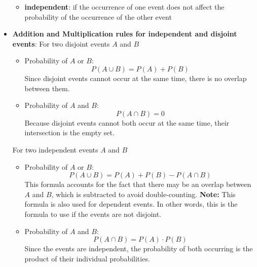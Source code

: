 \documentclass{report}
\begin{document}
\begin{itemize}
\begin{itemize}
                \item \textbf{independent}: if the occurrence of one event does not affect the probability of the occurrence of the other event
            \end{itemize}
        \item \textbf{Addition and Multiplication rules for independent and disjoint events}:
            \bigbreak \noindent 
            For two disjoint events $A$ and $B$
            \begin{itemize}
                \item Probability of \( A \) or \( B \):
                    \[
                        P(A \cup B) = P(A) + P(B)
                    \]
                    Since disjoint events cannot occur at the same time, there is no overlap between them.
                \item Probability of \( A \) and \( B \):
                    \[
                        P(A \cap B) = 0
                    \]
                    Because disjoint events cannot both occur at the same time, their intersection is the empty set.
            \end{itemize}
            \bigbreak \noindent 
            For two independent events $A$ and $B$
            \begin{itemize}
                \item Probability of \( A \) or \( B \):
                    \[
                        P(A \cup B) = P(A) + P(B) - P(A \cap B)
                    \]
                    This formula accounts for the fact that there may be an overlap between \( A \) and \( B \), which is subtracted to avoid double-counting.
                    \bigbreak \noindent 
                    \textbf{Note:} This formula is also used for dependent events. In other words, this is the formula to use if the events are not disjoint.
                \item Probability of \( A \) and \( B \):
                    \[
                        P(A \cap B) = P(A) \cdot P(B)
                    \]
                    Since the events are independent, the probability of both occurring is the product of their individual probabilities.


\end{itemize}
\end{itemize}
\end{document}
